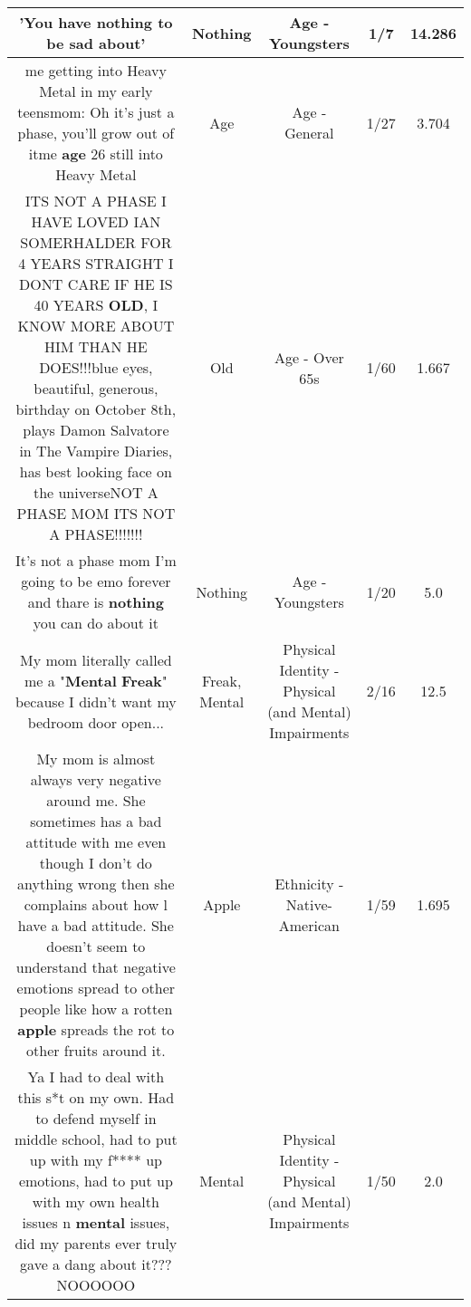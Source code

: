 \documentclass[11pt]{article}
\newlength\mylength
\begin{document}
\begin{center}
\begin{longtable}{|C{.65\mylength}|C{.30\mylength}|C{.12\mylength}|C{.12\mylength}|C{.12\mylength}|}
  \small 'You have \textbf{nothing} to be sad about'\normalsize   & Nothing & Age - Youngsters & 1/7 & 14.286 \\  \hline
  \small me getting into Heavy Metal in my early teensmom: Oh it's just a phase, you'll grow out of itme \textbf{age} 26 still into Heavy Metal\normalsize   & Age & Age - General & 1/27 & 3.704 \\  \hline
  \small ITS NOT A PHASE I HAVE LOVED IAN SOMERHALDER FOR 4 YEARS STRAIGHT I DONT CARE IF HE IS 40 YEARS \textbf{OLD}, I KNOW MORE ABOUT HIM THAN HE DOES!!!blue eyes, beautiful, generous, birthday on October 8th, plays Damon Salvatore in The Vampire Diaries, has best looking face on the universeNOT A PHASE MOM ITS NOT A PHASE!!!!!!!\normalsize   & Old & Age - Over 65s & 1/60 & 1.667 \\  \hline
  \small It's not a phase mom I'm going to be emo forever and thare is \textbf{nothing} you can do about it\normalsize   & Nothing & Age - Youngsters & 1/20 & 5.0 \\  \hline
  \small My mom literally called me a "\textbf{Mental} \textbf{Freak}" because I didn't want my bedroom door open...\normalsize   & Freak, Mental & Physical Identity - Physical (and Mental) Impairments & 2/16 & 12.5 \\  \hline
  \small My mom is almost always very negative around me. She sometimes has a bad attitude with me even though I don't do anything wrong then she complains about how l have a bad attitude.  She doesn't seem to understand that negative emotions spread to other people like how a rotten \textbf{apple} spreads the rot to other fruits around it.\normalsize   & Apple & Ethnicity - Native-American & 1/59 & 1.695 \\  \hline
  \small Ya I had to deal with this s*t on my own. Had to defend myself in middle school, had to put up with my f**** up emotions, had to put up with my own health issues n \textbf{mental} issues, did my parents ever truly gave a dang about it??? NOOOOOO\normalsize   & Mental & Physical Identity - Physical (and Mental) Impairments & 1/50 & 2.0 \\  \hline

\end{longtable}
\end{center}
\end{document}
